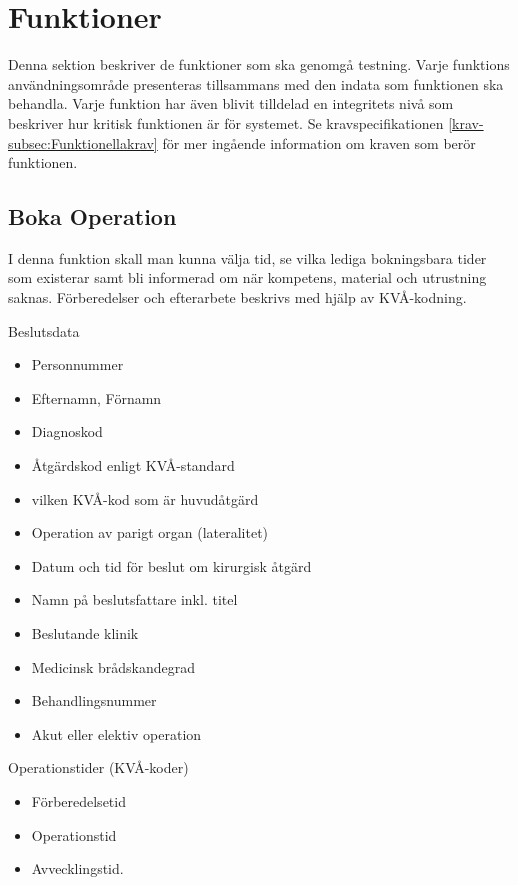 \documentclass[a4paper,10pt, twoside]{article}
\begin{document}
\section{Funktioner}
Denna sektion beskriver de funktioner som ska genomgå testning. Varje funktions användningsområde presenteras tillsammans 
med den indata som funktionen ska behandla. Varje funktion har även blivit tilldelad en integritets nivå som
beskriver hur kritisk funktionen är för systemet. Se kravspecifikationen \ref{krav-subsec:Funktionellakrav} för mer 
ingående information om kraven som berör funktionen.

\subsection{Boka Operation}
\label{sec:Boka Operation}
I denna funktion skall man kunna välja tid, se vilka lediga bokningsbara tider som existerar samt bli informerad om när 
kompetens, material och utrustning saknas. Förberedelser och efterarbete beskrivs med hjälp av KVÅ-kodning.

Beslutsdata
\begin{multicols}{3}
\begin{itemize}
	\item Personnummer
	\item Efternamn, Förnamn
	\item Diagnoskod
	\item Åtgärdskod enligt KVÅ-standard
	\item vilken KVÅ-kod som är huvudåtgärd
	\item Operation av parigt organ (lateralitet)
	\item Datum och tid för beslut om kirurgisk åtgärd
	\item Namn på beslutsfattare inkl. titel
	\item Beslutande klinik
	\item Medicinsk brådskandegrad
	\item Behandlingsnummer
	\item Akut eller elektiv operation
\end{itemize}
\end{multicols}

Operationstider (KVÅ-koder)
\begin{multicols}{3}
\begin{itemize}
	\item Förberedelsetid
	\item Operationstid
	\item Avvecklingstid.
\end{itemize}
\end{multicols}
\end{document}
